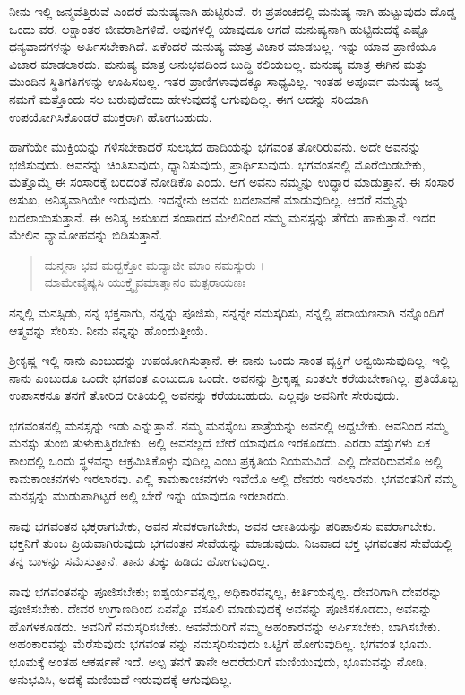 ನೀನು ಇಲ್ಲಿ ಜನ್ಮವೆತ್ತಿರುವೆ ಎಂದರೆ ಮನುಷ್ಯನಾಗಿ ಹುಟ್ಟಿರುವೆ. ಈ ಪ್ರಪಂಚದಲ್ಲಿ ಮನುಷ್ಯ ನಾಗಿ ಹುಟ್ಟುವುದು ದೊಡ್ಡ ಒಂದು ವರ. ಲಕ್ಷಾಂತರ ಜೀವರಾಶಿಗಳಿವೆ. ಅವುಗಳಲ್ಲಿ ಯಾವುದೂ ಆಗದೆ ಮನುಷ್ಯನಾಗಿ ಹುಟ್ಟಿದುದಕ್ಕೆ ಎಷ್ಟೊ ಧನ್ಯವಾದಗಳನ್ನು ಅರ್ಪಿಸಬೇಕಾಗಿದೆ. ಏಕೆಂದರೆ ಮನುಷ್ಯ ಮಾತ್ರ ವಿಚಾರ ಮಾಡಬಲ್ಲ. ಇನ್ನು ಯಾವ ಪ್ರಾಣಿಯೂ ವಿಚಾರ ಮಾಡಲಾರದು. ಮನುಷ್ಯ ಮಾತ್ರ ಅನುಭವದಿಂದ ಬುದ್ಧಿ ಕಲಿಯಬಲ್ಲ. ಮನುಷ್ಯ ಮಾತ್ರ ಈಗಿನ ಮತ್ತು ಮುಂದಿನ ಸ್ಥಿತಿಗತಿಗಳನ್ನು ಊಹಿಸಬಲ್ಲ. ಇತರ ಪ್ರಾಣಿಗಳಾವುದಕ್ಕೂ ಸಾಧ್ಯವಿಲ್ಲ. ಇಂತಹ ಅಪೂರ್ವ ಮನುಷ್ಯ ಜನ್ಮ ನಮಗೆ ಮತ್ತೊಂದು ಸಲ ಬರುವುದೆಂದು ಹೇಳುವುದಕ್ಕೆ ಆಗುವುದಿಲ್ಲ. ಈಗ ಅದನ್ನು ಸರಿಯಾಗಿ ಉಪಯೋಗಿಸಿಕೊಂಡರೆ ಮುಕ್ತರಾಗಿ ಹೋಗಬಹುದು.

ಹಾಗೆಯೇ ಮುಕ್ತಿಯನ್ನು ಗಳಿಸಬೇಕಾದರೆ ಸುಲಭದ ಹಾದಿಯನ್ನು ಭಗವಂತ ತೋರಿರುವನು. ಅದೇ ಅವನನ್ನು ಭಜಿಸುವುದು. ಅವನನ್ನು ಚಿಂತಿಸುವುದು, ಧ್ಯಾನಿಸುವುದು, ಪ್ರಾರ್ಥಿಸುವುದು. ಭಗವಂತನಲ್ಲಿ ಮೊರೆಯಿಡಬೇಕು, ಮತ್ತೊಮ್ಮೆ ಈ ಸಂಸಾರಕ್ಕೆ ಬರದಂತೆ ನೋಡಿಕೊ ಎಂದು. ಆಗ ಅವನು ನಮ್ಮನ್ನು ಉದ್ಧಾರ ಮಾಡುತ್ತಾನೆ. ಈ ಸಂಸಾರ ಅಸುಖ, ಅನಿತ್ಯವಾಗಿಯೇ ಇರುವುದು. ಇದನ್ನೇನು ಅವನು ಬದಲಾವಣೆ ಮಾಡುವುದಿಲ್ಲ. ಆದರೆ ನಮ್ಮನ್ನು ಬದಲಾಯಿಸುತ್ತಾನೆ. ಈ ಅನಿತ್ಯ ಅಸುಖದ ಸಂಸಾರದ ಮೇಲಿನಿಂದ ನಮ್ಮ ಮನಸ್ಸನ್ನು ತೆಗೆದು ಹಾಕುತ್ತಾನೆ. ಇದರ ಮೇಲಿನ ವ್ಯಾಮೋಹವನ್ನು ಬಿಡಿಸುತ್ತಾನೆ.

\begin{verse}
ಮನ್ಮನಾ ಭವ ಮದ್ಭಕ್ತೋ ಮದ್ಯಾಜೀ ಮಾಂ ನಮಸ್ಕುರು ।\\ಮಾಮೇವೈಷ್ಯಸಿ ಯುಕ್ತ್ವೈವಮಾತ್ಮಾನಂ ಮತ್ಪರಾಯಣಃ 
\end{verse}

{\small ನನ್ನಲ್ಲಿ ಮನಸ್ಸಿಡು, ನನ್ನ ಭಕ್ತನಾಗು, ನನ್ನನ್ನು ಪೂಜಿಸು, ನನ್ನನ್ನೇ ನಮಸ್ಕರಿಸು, ನನ್ನಲ್ಲಿ ಪರಾಯಣನಾಗಿ ನನ್ನೊಂದಿಗೆ ಆತ್ಮವನ್ನು ಸೇರಿಸು. ನೀನು ನನ್ನನ್ನು ಹೊಂದುತ್ತೀಯೆ.}

ಶ್ರೀಕೃಷ್ಣ ಇಲ್ಲಿ ನಾನು ಎಂಬುದನ್ನು ಉಪಯೋಗಿಸುತ್ತಾನೆ. ಈ ನಾನು ಒಂದು ಸಾಂತ ವ್ಯಕ್ತಿಗೆ ಅನ್ವಯಿಸುವುದಿಲ್ಲ. ಇಲ್ಲಿ ನಾನು ಎಂಬುದೂ ಒಂದೇ ಭಗವಂತ ಎಂಬುದೂ ಒಂದೇ. ಅವನನ್ನು ಶ್ರೀಕೃಷ್ಣ ಎಂತಲೇ ಕರೆಯಬೇಕಾಗಿಲ್ಲ. ಪ್ರತಿಯೊಬ್ಬ ಉಪಾಸಕನೂ ತನಗೆ ತೋರಿದ ರೀತಿಯಲ್ಲಿ ಅವನನ್ನು ಕರೆಯಬಹುದು. ಎಲ್ಲವೂ ಅವನಿಗೇ ಸೇರುವುದು.

ಭಗವಂತನಲ್ಲಿ ಮನಸ್ಸನ್ನು ಇಡು ಎನ್ನುತ್ತಾನೆ. ನಮ್ಮ ಮನಸ್ಸೆಂಬ ಪಾತ್ರೆಯನ್ನು ಅವನಲ್ಲಿ ಅದ್ದಬೇಕು. ಅವನಿಂದ ನಮ್ಮ ಮನಸ್ಸು ತುಂಬಿ ತುಳುಕುತ್ತಿರಬೇಕು. ಅಲ್ಲಿ ಅವನಲ್ಲದೆ ಬೇರೆ ಯಾವುದೂ ಇರಕೂಡದು. ಎರಡು ವಸ್ತುಗಳು ಏಕ ಕಾಲದಲ್ಲಿ ಒಂದು ಸ್ಥಳವನ್ನು ಆಕ್ರಮಿಸಿಕೊಳ್ಳು ವುದಿಲ್ಲ ಎಂಬ ಪ್ರಕೃತಿಯ ನಿಯಮವಿದೆ. ಎಲ್ಲಿ ದೇವರಿರುವನೊ ಅಲ್ಲಿ ಕಾಮಕಾಂಚನಗಳು ಇರಲಾರವು. ಎಲ್ಲಿ ಕಾಮಕಾಂಚನಗಳು ಇವೆಯೊ ಅಲ್ಲಿ ದೇವರು ಇರಲಾರನು. ಭಗವಂತನಿಗೆ ನಮ್ಮ ಮನಸ್ಸನ್ನು ಮುಡುಪಾಗಿಟ್ಟರೆ ಅಲ್ಲಿ ಬೇರೆ ಇನ್ನು ಯಾವುದೂ ಇರಲಾರದು.

ನಾವು ಭಗವಂತನ ಭಕ್ತರಾಗಬೇಕು, ಅವನ ಸೇವಕರಾಗಬೇಕು, ಅವನ ಆಣತಿಯನ್ನು ಪರಿಪಾಲಿಸು ವವರಾಗಬೇಕು. ಭಕ್ತನಿಗೆ ತುಂಬ ಪ್ರಿಯವಾಗಿರುವುದು ಭಗವಂತನ ಸೇವೆಯನ್ನು ಮಾಡುವುದು. ನಿಜವಾದ ಭಕ್ತ ಭಗವಂತನ ಸೇವೆಯಲ್ಲಿ ತನ್ನ ಬಾಳನ್ನು ಸಮೆಸುತ್ತಾನೆ. ತಾನು ತುಕ್ಕು ಹಿಡಿದು ಹೋಗುವುದಿಲ್ಲ.

ನಾವು ಭಗವಂತನನ್ನು ಪೂಜಿಸಬೇಕು; ಐಶ್ವರ್ಯವನ್ನಲ್ಲ, ಅಧಿಕಾರವನ್ನಲ್ಲ, ಕೀರ್ತಿಯನ್ನಲ್ಲ. ದೇವರಿಗಾಗಿ ದೇವರನ್ನು ಪೂಜಿಸಬೇಕು. ದೇವರ ಉಗ್ರಾಣದಿಂದ ಏನನ್ನೊ ವಸೂಲಿ ಮಾಡುವುದಕ್ಕೆ ಅವನನ್ನು ಪೂಜಿಸಕೂಡದು, ಅವನನ್ನು ಹೊಗಳಕೂಡದು. ಅವನಿಗೆ ನಮಸ್ಕರಿಸಬೇಕು. ಅವನೆದುರಿಗೆ ನಮ್ಮ ಅಹಂಕಾರವನ್ನು ಅರ್ಪಿಸಬೇಕು, ಬಾಗಿಸಬೇಕು. ಅಹಂಕಾರವನ್ನು ಮೆರೆಸುವುದು ಭಗವಂತ ನನ್ನು ನಮಸ್ಕರಿಸುವುದು ಒಟ್ಟಿಗೆ ಹೋಗುವುದಿಲ್ಲ. ಭಗವಂತ ಭೂಮ. ಭೂಮಕ್ಕೆ ಅಂತಹ ಆಕರ್ಷಣೆ ಇದೆ. ಅಲ್ಪ ತನಗೆ ತಾನೇ ಅದರೆದುರಿಗೆ ಮಣಿಯುವುದು, ಭೂಮವನ್ನು ನೋಡಿ, ಅನುಭವಿಸಿ, ಅದಕ್ಕೆ ಮಣಿಯದೆ ಇರುವುದಕ್ಕೆ ಆಗುವುದಿಲ್ಲ.

